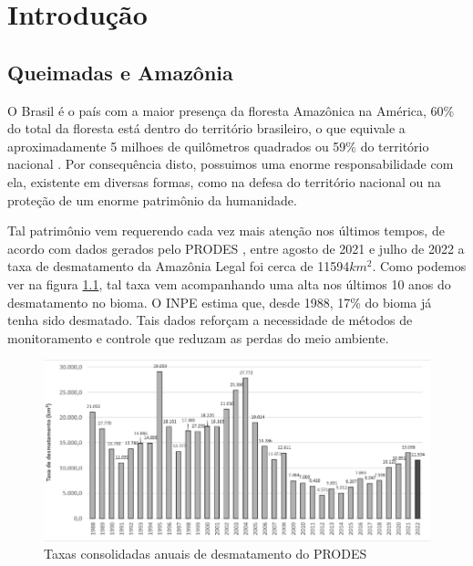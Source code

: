 \chapter{Introdução}
\label{cap_intr}
\section{Queimadas e Amazônia}
O Brasil é o país com a maior presença da floresta Amazônica na América, 60\% do total da floresta está dentro do território brasileiro, o que equivale a aproximadamente 5 milhoes de quilômetros quadrados ou 59\% do território nacional \cite{tamanhoIBGE}. Por consequência disto, possuimos uma enorme responsabilidade com ela, existente em diversas formas, como na defesa do território nacional ou na proteção de um enorme patrimônio da humanidade. 

Tal patrimônio vem requerendo cada vez mais atenção nos últimos tempos, de acordo com dados gerados pelo PRODES \cite{novatecnica}, entre agosto de 2021 e julho de 2022 a taxa de desmatamento da Amazônia Legal foi cerca de 11594$km^{2}$. Como podemos ver na figura \ref{fig:prodesgraph}, tal taxa vem acompanhando uma alta nos últimos 10 anos do desmatamento no bioma. O INPE \cite{INPE} estima que, desde 1988, 17\% do bioma já tenha sido desmatado. Tais dados reforçam a necessidade de métodos de monitoramento e controle que reduzam as perdas do meio ambiente.

\begin{figure}[htb]
	\centering
	\begin{minipage}{0.9\linewidth}
		\centering
		\includegraphics[width=\linewidth]{tg1/figuras/prodes.png}
		\caption{Taxas consolidadas anuais de desmatamento do PRODES \cite{novatecnica}}
            \label{fig:prodesgraph}
	\end{minipage}
\end{figure}


